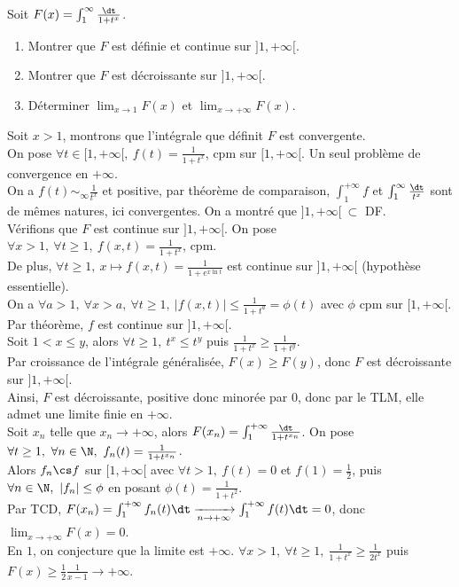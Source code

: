 \documentclass[11pt]{article}
\begin{document}
\begin{ex}{}{}
    Soit $F(x)=\int_1^\infty\frac{\dt}{1+t^x}$.
    \begin{enumerate}
        \item Montrer que $F$ est définie et continue sur $]1,+\infty[$.
        \item Montrer que $F$ est décroissante sur $]1,+\infty[$.
        \item Déterminer $\lim_{x\to 1}F(x)$ et $\lim_{x\to+\infty}F(x)$.
    \end{enumerate}
    \tcblower
     Soit $x>1$, montrons que l'intégrale que définit $F$ est convergente.\\
    On pose $\forall t \in [1,+\infty[, ~ f(t)=\frac{1}{1+t^x}$, cpm sur $[1,+\infty[$. Un seul problème de convergence en $+\infty$.\\
    On a $f(t)\sim_{\infty}\frac{1}{t^x}$ et positive, par théorème de comparaison, $\int_1^{+\infty} f$ et $\int_1^\infty\frac{\dt}{t^x}$ sont de mêmes natures, ici convergentes. On a montré que $]1,+\infty[ ~ \subset$ DF.\\
    Vérifions que $F$ est continue sur $]1,+\infty[$. On pose $\forall x>1, ~ \forall t \geq 1, ~ f(x,t)=\frac{1}{1+t^x}$, cpm.\\
    De plus, $\forall t \geq 1, ~ x\mapsto f(x,t)=\frac{1}{1+e^{x\ln t}}$ est continue sur $]1,+\infty[$ (hypothèse essentielle).\\
    On a $\forall a > 1, ~ \forall x > a, ~ \forall t \geq 1, ~  |f(x,t)|\leq\frac{1}{1+t^a}=\phi(t)$ avec $\phi$ cpm sur $[1,+\infty[$.\\
    Par théorème, $f$ est continue sur $]1,+\infty[$.\\
     Soit $1<x\leq y$, alors $\forall t \geq 1, ~ t^x \leq t^y$ puis $\frac{1}{1+t^x}\geq\frac{1}{1+t^y}$.\\
    Par croissance de l'intégrale généralisée, $F(x)\geq F(y)$, donc $F$ est décroissante sur $]1,+\infty[$.\\
    Ainsi, $F$ est décroissante, positive donc minorée par 0, donc par le TLM, elle admet une limite finie en $+\infty$.\\
     Soit $x_n$ telle que $x_n\to +\infty$, alors $F(x_n)=\int_1^{+\infty}\frac{\dt}{1+t^{x_n}}$. On pose $\forall t \geq 1, ~ \forall n \in \N, ~  f_n(t)=\frac{1}{1+t^{x_n}}$.\\
    Alors $f_n\cs f$ sur $[1,+\infty[$ avec $\forall t > 1, ~ f(t)=0$ et $f(1)=\frac{1}{2}$, puis $\forall n \in \N, ~ |f_n|\leq\phi$ en posant $\phi(t)=\frac{1}{1+t^2}$.\\
    Par TCD, $F(x_n)=\int_1^{+\infty}f_n(t)\dt\xrightarrow[n\to+\infty]{}\int_1^{+\infty}f(t)\dt=0$, donc $\lim_{x\to+\infty}F(x)=0$.\\
    En $1$, on conjecture que la limite est $+\infty$. $\forall x > 1, ~ \forall t \geq 1, ~ \frac{1}{1+t^x}\geq\frac{1}{2t^x}$ puis $F(x)\geq\frac{1}{2}\frac{1}{x-1}\to+\infty$.
\end{ex}
\end{document}
